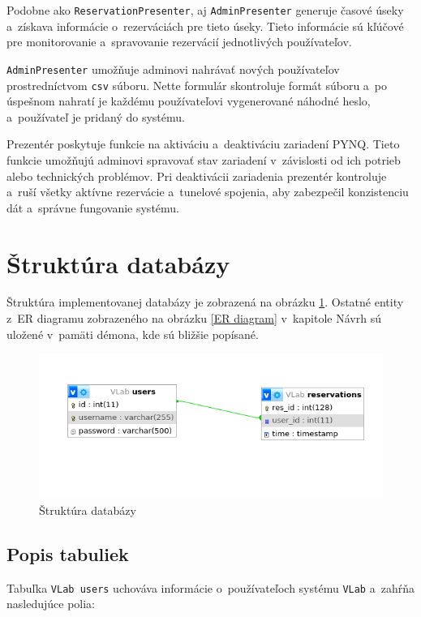Podobne ako \verb|ReservationPresenter|, aj \verb|AdminPresenter| generuje časové úseky a~získava informácie o~rezerváciách pre tieto úseky. Tieto informácie sú kľúčové pre monitorovanie a~spravovanie rezervácií jednotlivých používateľov.

\verb|AdminPresenter| umožňuje adminovi nahrávať nových používateľov prostredníctvom \verb|csv| súboru. Nette formulár skontroluje formát súboru a~po úspešnom nahratí je každému používateľovi vygenerované náhodné heslo, a~používateľ je pridaný do systému.

Prezentér poskytuje funkcie na aktiváciu a~deaktiváciu zariadení PYNQ. Tieto funkcie umožňujú adminovi spravovať stav zariadení v~závislosti od ich potrieb alebo technických problémov. Pri deaktivácii zariadenia prezentér kontroluje a~ruší všetky aktívne rezervácie a~tunelové spojenia, aby zabezpečil konzistenciu dát a~správne fungovanie systému.

\section{Štruktúra databázy}

Štruktúra implementovanej databázy je zobrazená na obrázku \ref{Databaza}. Ostatné entity z~ER diagramu zobrazeného na obrázku \ref{ER diagram} v~kapitole Návrh sú uložené v~pamäti démona, kde sú bližšie popísané.

\begin{figure}[b] \label{Databaza}
    \centering
    \includegraphics[width=0.8\linewidth]{obrazky-figures/VirtualBoxVM_attUCmGkYe.png}
    \caption{Štruktúra databázy}
\end{figure}

\subsection{Popis tabuliek}

Tabuľka \verb|VLab users| uchováva informácie o~používateľoch systému \verb|VLab| a~zahŕňa nasledujúce polia:

